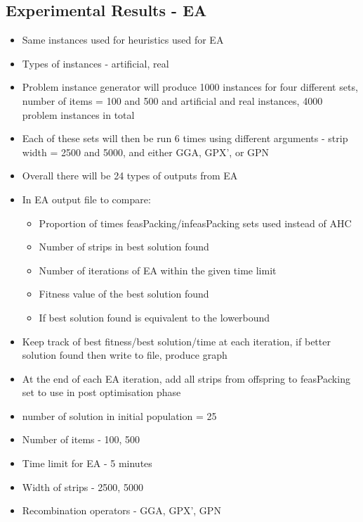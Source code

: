 \documentclass{elsarticle}
\begin{document}
\subsection{Experimental Results - EA}
\begin{itemize}
	\item Same instances used for heuristics used for EA
	\item Types of instances - artificial, real
	\item Problem instance generator will produce 1000 instances for four different sets, number of items = 100 and 500 and artificial and real instances, 4000 problem instances in total
	\item Each of these sets will then be run 6 times using different arguments - strip width = 2500 and 5000, and either GGA, GPX', or GPN
	\item Overall there will be 24 types of outputs from EA
	\item In EA output file to compare:
	\begin{itemize}
		\item Proportion of times feasPacking/infeasPacking sets used instead of AHC
		\item Number of strips in best solution found
		\item Number of iterations of EA within the given time limit
		\item Fitness value of the best solution found
		\item If best solution found is equivalent to the lowerbound
	\end{itemize}
	\item Keep track of best fitness/best solution/time at each iteration, if better solution found then write to file, produce graph
	\item At the end of each EA iteration, add all strips from offspring to feasPacking set to use in post optimisation phase
	\item number of solution in initial population = 25
	\item Number of items - 100, 500
	\item Time limit for EA - 5 minutes
	\item Width of strips - 2500, 5000
	\item Recombination operators - GGA, GPX', GPN
\end{itemize}
\end{document}
